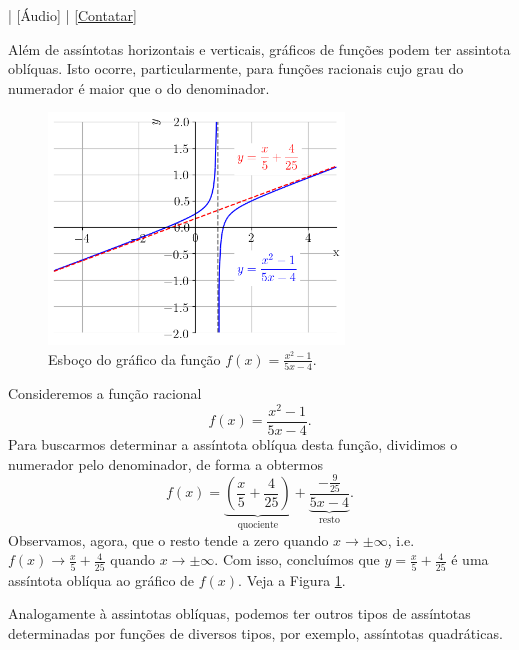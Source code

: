\begin{flushright}
  [Vídeo] | [Áudio] | \href{https://phkonzen.github.io/notas/contato.html}{[Contatar]}
\end{flushright}

Além de assíntotas horizontais e verticais, gráficos de funções podem ter assintota oblíquas. Isto ocorre, particularmente, para funções racionais cujo grau do numerador é maior que o do denominador.

\begin{figure}[H]
  \centering
  \includegraphics[width=0.7\textwidth]{./cap_lim/dados/fig_ex_ass_obl/fig}
  \caption{Esboço do gráfico da função $\displaystyle f(x) = \frac{x^2-1}{5x-4}$.}
  \label{fig:ex_ass_obl}
\end{figure}


\begin{ex}
  Consideremos a função racional
  \begin{equation}
    f(x) = \frac{x^2-1}{5x-4}.
  \end{equation}
  Para buscarmos determinar a assíntota oblíqua desta função, dividimos o numerador pelo denominador, de forma a obtermos
  \begin{equation}
    f(x) = \underbrace{\left(\frac{x}{5}+\frac{4}{25}\right)}_{\text{quociente}} + \underbrace{\frac{-\frac{9}{25}}{5x-4}}_{\text{resto}}.
  \end{equation}
  Observamos, agora, que o resto tende a zero quando $x\to\pm\infty$, i.e. $\displaystyle f(x)\to \frac{x}{5}+\frac{4}{25}$ quando $x\to\pm\infty$. Com isso, concluímos que $\displaystyle y = \frac{x}{5}+\frac{4}{25}$ é uma assíntota oblíqua ao gráfico de $f(x)$. Veja a Figura \ref{fig:ex_ass_obl}.
\end{ex}

\begin{obs}
  Analogamente à assintotas oblíquas, podemos ter outros tipos de assíntotas determinadas por funções de diversos tipos, por exemplo, assíntotas quadráticas.
\end{obs}

